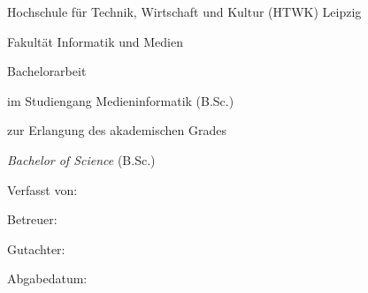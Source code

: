 
\begin{titlepage}
\centering

\vspace*{1cm}

{\normalsize Hochschule für Technik, Wirtschaft und Kultur (HTWK) Leipzig\par}
{\normalsize Fakultät Informatik und Medien\par}

\vspace{2cm}

{\large Bachelorarbeit\par}
{\normalsize im Studiengang Medieninformatik (B.Sc.)\par}
\vspace{1cm}

{\normalsize zur Erlangung des akademischen Grades\par}
{\normalsize \textit{Bachelor of Science} (B.Sc.)\par}

\vspace{2.5cm}

{\Large \bfseries \ThesisTitle\par}

\vspace{2.5cm}

{\large Verfasst von: \ThesisAuthor\par}

\vspace{2cm}

{\normalsize Betreuer:\par}
{\normalsize \ThesisSupervisorUniversity\par}

\vspace{0.8cm}

{\normalsize Gutachter:\par}
{\normalsize \ThesisSupervisorCompany\par}

\vfill

{\normalsize Abgabedatum: \ThesisDate\par}

\end{titlepage}

\cleardoublepage
